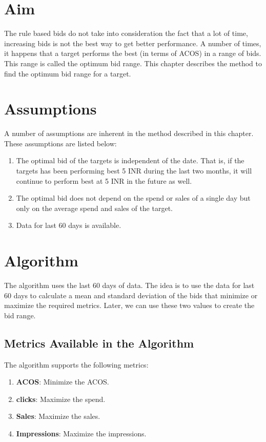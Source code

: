 \section{Aim}

The rule based bids do not take into consideration the fact that a lot of time, increasing bids is not the best way to get better performance. A number of times, it happens that a target performs the best (in terms of ACOS) in a range of bids. This range is called the optimum bid range. This chapter describes the method to find the optimum bid range for a target.

\section{Assumptions}

A number of assumptions are inherent in the method described in this chapter. These assumptions are listed below:

\begin{enumerate}
    \item The optimal bid of the targets is independent of the date. That is, if the targets has been performing best 5 INR during the last two months, it will continue to perform best at 5 INR in the future as well.
    \item The optimal bid does not depend on the spend or sales of a single day but only on the average spend and sales of the target.
    \item Data for last 60 days is available.
\end{enumerate}

\section{Algorithm}

The algorithm uses the last 60 days of data. The idea is to use the data for last 60 days to calculate a mean and standard deviation of the bids that minimize or maximize the required metrics. Later, we can use these two values to create the bid range.

\subsection{Metrics Available in the Algorithm}

The algorithm supports the following metrics:

\begin{enumerate}
    \item \textbf{ACOS}: Minimize the ACOS.
    \item \textbf{clicks}: Maximize the spend.
    \item \textbf{Sales}: Maximize the sales.
    \item \textbf{Impressions}: Maximize the impressions.
\end{enumerate}

